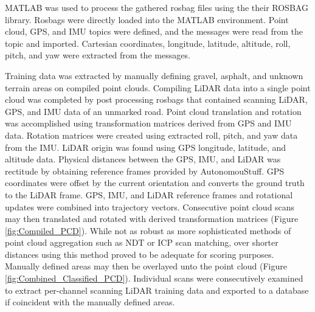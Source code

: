 \documentclass[journal,onecolumn]{IEEEtran}
\begin{document}
	{MATLAB was used to process the gathered rosbag files using the their ROSBAG library. Rosbags were directly loaded into the MATLAB environment. Point cloud, GPS, and IMU topics were defined, and the messages were read from the topic and imported. Cartesian coordinates, longitude, latitude, altitude, roll, pitch, and yaw were extracted from the messages.}
	
	{Training data was extracted by manually defining gravel, asphalt, and unknown terrain areas on compiled point clouds. Compiling LiDAR data into a single point cloud was completed by post processing rosbags that contained scanning LiDAR, GPS, and IMU data of an unmarked road. Point cloud translation and rotation was accomplished using transformation matrices derived from GPS and IMU data. Rotation matrices were created using extracted roll, pitch, and yaw data from the IMU. LiDAR origin was found using GPS longitude, latitude, and altitude data. Physical distances between the GPS, IMU, and LiDAR was rectitude by obtaining reference frames provided by AutonomouStuff. GPS coordinates were offset by the current orientation and converts the ground truth to the LiDAR frame. GPS, IMU, and LiDAR reference frames and rotational updates were combined into trajectory vectors. Consecutive point cloud scans may then translated and rotated with derived transformation matrices (Figure \ref{fig:Compiled_PCD}). While not as robust as more sophisticated methods of point cloud aggregation such as NDT or ICP scan matching, over shorter distances using this method proved to be adequate for scoring purposes. Manually defined areas may then be overlayed unto the point cloud (Figure \ref{fig:Combined_Classified_PCD}). Individual scans were consecutively examined to extract per-channel scanning LiDAR training data and exported to a database if coincident with the manually defined areas.}
	
\end{document}
